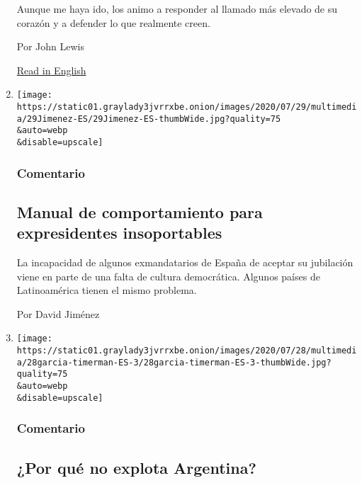 \begin{enumerate}
  Aunque me haya ido, los animo a responder al llamado más elevado de su
  corazón y a defender lo que realmente creen.

  Por John Lewis

  \href{https://www.nytimes3xbfgragh.onion/2020/07/30/opinion/john-lewis-civil-rights-america.html}{Read
  in English}
\item
  \href{/es/2020/07/29/espanol/opinion/espana-felipe-gonzalez-jose-maria-aznar.html}{}

  \texttt{[image: https://static01.graylady3jvrrxbe.onion/images/2020/07/29/multimedia/29Jimenez-ES/29Jimenez-ES-thumbWide.jpg?quality=75\\\&auto=webp\\\&disable=upscale]}

  \hypertarget{comentario-9}{%
  \subsubsection{Comentario}\label{comentario-9}}

  \hypertarget{manual-de-comportamiento-para-expresidentes-insoportables}{%
  \subsection{Manual de comportamiento para expresidentes
  insoportables}\label{manual-de-comportamiento-para-expresidentes-insoportables}}

  La incapacidad de algunos exmandatarios de España de aceptar su
  jubilación viene en parte de una falta de cultura democrática. Algunos
  países de Latinoamérica tienen el mismo problema.

  Por David Jiménez
\item
  \href{/es/2020/07/28/espanol/opinion/argentina-estallido-2001-coronavirus.html}{}

  \texttt{[image: https://static01.graylady3jvrrxbe.onion/images/2020/07/28/multimedia/28garcia-timerman-ES-3/28garcia-timerman-ES-3-thumbWide.jpg?quality=75\\\&auto=webp\\\&disable=upscale]}

  \hypertarget{comentario-10}{%
  \subsubsection{Comentario}\label{comentario-10}}

  \hypertarget{por-quuxe9-no-explota-argentina}{%
  \subsection{¿Por qué no explota
  Argentina?}\label{por-quuxe9-no-explota-argentina}}


\end{enumerate}
